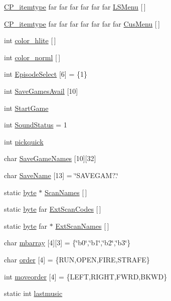 \begin{DoxyCompactItemize}
\item 
\hyperlink{structCP__itemtype}{CP\_\-itemtype} far far far far far far \hyperlink{WL__MENU_8C_a2a2c5b1eed7ee351f0917f90135da14c}{LSMenu} \mbox{[}$\,$\mbox{]}
\item 
\hyperlink{structCP__itemtype}{CP\_\-itemtype} far far far far far far far \hyperlink{WL__MENU_8C_a955cb28792558e0cffd3eb880bc17b23}{CusMenu} \mbox{[}$\,$\mbox{]}
\item 
int \hyperlink{WL__MENU_8C_a0eb1bcd3103f302b8ddeff72aeeb27f2}{color\_\-hlite} \mbox{[}$\,$\mbox{]}
\item 
int \hyperlink{WL__MENU_8C_a2b223cf6ceaaa765e424eff35bd4cdd9}{color\_\-norml} \mbox{[}$\,$\mbox{]}
\item 
int \hyperlink{WL__MENU_8C_ac9a0802b2e58dc7ba8970f6ae09fc2bb}{EpisodeSelect} \mbox{[}6\mbox{]} = \{1\}
\item 
int \hyperlink{WL__MENU_8C_a7b06c11298b6b799f082f8188c0dbd2c}{SaveGamesAvail} \mbox{[}10\mbox{]}
\item 
int \hyperlink{WL__MENU_8C_a15b7f4ec468d94c3291394639f2fe581}{StartGame}
\item 
int \hyperlink{WL__MENU_8C_a0564d61a788235ef511758c3922b9927}{SoundStatus} = 1
\item 
int \hyperlink{WL__MENU_8C_afe4c3831bb85073cc5118faefa59bee3}{pickquick}
\item 
char \hyperlink{WL__MENU_8C_a676a8d7bb5b64f29ab3ea8fe6a4f3242}{SaveGameNames} \mbox{[}10\mbox{]}\mbox{[}32\mbox{]}
\item 
char \hyperlink{WL__MENU_8C_a8501cb4aab0ffc4fca7a7a979ae7728d}{SaveName} \mbox{[}13\mbox{]} = \char`\"{}SAVEGAM?.\char`\"{}
\item 
static \hyperlink{ID__HEAD_8H_a0c8186d9b9b7880309c27230bbb5e69d}{byte} $\ast$ \hyperlink{WL__MENU_8C_ac518bdab6a3394470ca5df383625f614}{ScanNames} \mbox{[}$\,$\mbox{]}
\item 
static \hyperlink{ID__HEAD_8H_a0c8186d9b9b7880309c27230bbb5e69d}{byte} far \hyperlink{WL__MENU_8C_a54c559a79dbb86e12d4c934c6dc47d13}{ExtScanCodes} \mbox{[}$\,$\mbox{]}
\item 
static \hyperlink{ID__HEAD_8H_a0c8186d9b9b7880309c27230bbb5e69d}{byte} far $\ast$ \hyperlink{WL__MENU_8C_a4f10ad453385a6043f005a6cfb27519f}{ExtScanNames} \mbox{[}$\,$\mbox{]}
\item 
char \hyperlink{WL__MENU_8C_a8de55afa8bdf66f3a7e239b17b252799}{mbarray} \mbox{[}4\mbox{]}\mbox{[}3\mbox{]} = \{\char`\"{}b0\char`\"{},\char`\"{}b1\char`\"{},\char`\"{}b2\char`\"{},\char`\"{}b3\char`\"{}\}
\item 
char \hyperlink{WL__MENU_8C_a907c3a6256dd10a071ee545d4249825a}{order} \mbox{[}4\mbox{]} = \{RUN,OPEN,FIRE,STRAFE\}
\item 
int \hyperlink{WL__MENU_8C_a5d4e98961f91335c9e7de9fb8313cd08}{moveorder} \mbox{[}4\mbox{]} = \{LEFT,RIGHT,FWRD,BKWD\}
\item 
static int \hyperlink{WL__MENU_8C_ada3e1ba24dc039c28f508775f883731e}{lastmusic}
\end{DoxyCompactItemize}


